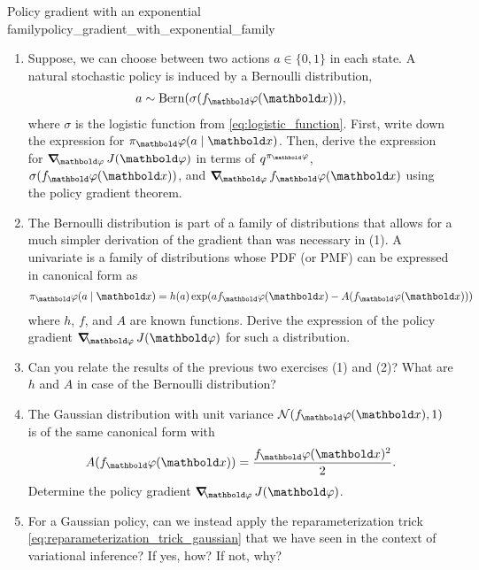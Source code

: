 \begin{nexercise}{Policy gradient with an exponential family}{policy_gradient_with_exponential_family}
  \begin{enumerate}
    \item Suppose, we can choose between two actions $a \in \{0, 1\}$ in each state.
    A natural stochastic policy is induced by a Bernoulli distribution, \begin{align}
      a \sim \Bern{\sigma(f_\vvarphi(\vx))},
    \end{align} where $\sigma$ is the logistic function from \cref{eq:logistic_function}.
    First, write down the expression for $\pi_\vvarphi(a \mid \vx)$.
    Then, derive the expression for $\grad_\vvarphi \j{\vvarphi}$ in terms of $\fnq[\pi_\vvarphi]$, $\sigma(f_\vvarphi(\vx))$, and $\grad_\vvarphi f_\vvarphi(\vx)$ using the policy gradient theorem.

    \item The Bernoulli distribution is part of a family of distributions that allows for a much simpler derivation of the gradient than was necessary in (1).
    A univariate  is a family of distributions whose PDF (or PMF) can be expressed in canonical form as \begin{align}
      \pi_\vvarphi(a \mid \vx) = h(a) \exp(a f_\vvarphi(\vx) - A(f_\vvarphi(\vx)))
    \end{align} where $h$, $f$, and $A$ are known functions.
    Derive the expression of the policy gradient $\grad_\vvarphi \j{\vvarphi}$ for such a distribution.

    \item Can you relate the results of the previous two exercises (1) and (2)?
    What are $h$ and $A$ in case of the Bernoulli distribution?

    \item The Gaussian distribution with unit variance $\N{f_\vvarphi(\vx)}{1}$ is of the same canonical form with \begin{align}
      A(f_\vvarphi(\vx)) = \frac{f_\vvarphi(\vx)^2}{2}.
    \end{align}
    Determine the policy gradient $\grad_\vvarphi \j{\vvarphi}$.

    \item For a Gaussian policy, can we instead apply the reparameterization trick \eqref{eq:reparameterization_trick_gaussian} that we have seen in the context of variational inference? If yes, how? If not, why?
  \end{enumerate}
\end{nexercise}

